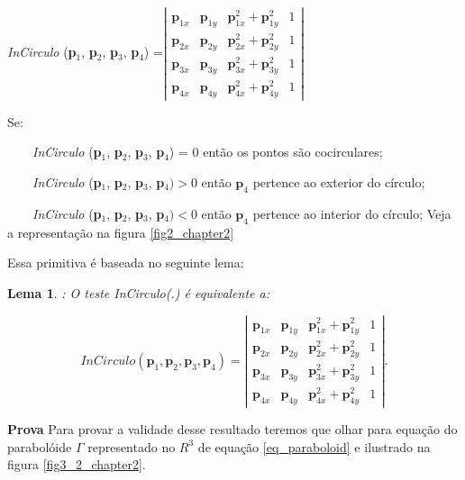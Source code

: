 \documentclass[12pt,a4paper]{book}
\newtheorem{Lem}{Lema}
\begin{document}
\textit{InCirculo }(\textbf{p}$_{1}$, \textbf{p}$_{2}$, \textbf{p}$_{3}$, 
\textbf{p}$_{4}$) =$\left| 
\begin{array}{cccc}
\mathbf{p}_{1x} & \mathbf{p}_{1y} & \mathbf{p}_{1x}^{2}+\mathbf{p}_{1y}^{2}
& 1 \\ 
\mathbf{p}_{2x} & \mathbf{p}_{2y} & \mathbf{p}_{2x}^{2}+\mathbf{p}_{2y}^{2}
& 1 \\ 
\mathbf{p}_{3x} & \mathbf{p}_{3y} & \mathbf{p}_{3x}^{2}+\mathbf{p}_{3y}^{2}
& 1 \\ 
\mathbf{p}_{4x} & \mathbf{p}_{4y} & \mathbf{p}_{4x}^{2}+\mathbf{p}_{4y}^{2}
& 1%
\end{array}
\right| $

Se:

\ \ \ \ \textit{InCirculo }(\textbf{p}$_{1}$, \textbf{p}$_{2}$, \textbf{p}$%
_{3}$, \textbf{p}$_{4}$) = 0 ent\~{a}o os pontos s\~{a}o cocirculares;

\ \ \ \ \textit{InCirculo }(\textbf{p}$_{1}$, \textbf{p}$_{2}$, \textbf{p}$%
_{3}$, \textbf{p}$_{4}) > 0$  ent\~{a}o $\mathbf{p}_{4}$
pertence ao exterior do c\'{i}rculo;

\ \ \ \ \textit{InCirculo }(\textbf{p}$_{1}$, \textbf{p}$_{2}$, \textbf{p}$%
_{3}$, \textbf{p}$_{4}) < 0$ ent\~{a}o $\mathbf{p}_{4}$
pertence ao interior do c\'{i}rculo;
Veja a representa\c{c}\~{a}o  na figura \ref{fig2_chapter2}
\ \ 

Essa primitiva \'{e} baseada no seguinte lema:

\begin{Lem}
: O teste \textit{InCirculo}(.) \'{e} equivalente a:
\end{Lem}

\begin{equation}
\textit{InCirculo} (\mathbf{p}_{1},\mathbf{p}_{2},\mathbf{p}_{3},\mathbf{p}_{4})=\left\vert 
\begin{array}{cccc}
\mathbf{p}_{1x} & \mathbf{p}_{1y} & \mathbf{p}_{1x}^{2}+\mathbf{p}_{1y}^{2}
& 1 \\ 
\mathbf{p}_{2x} & \mathbf{p}_{2y} & \mathbf{p}_{2x}^{2}+\mathbf{p}_{2y}^{2}
& 1 \\ 
\mathbf{p}_{3x} & \mathbf{p}_{3y} & \mathbf{p}_{3x}^{2}+\mathbf{p}_{3y}^{2}
& 1 \\ 
\mathbf{p}_{4x} & \mathbf{p}_{4y} & \mathbf{p}_{4x}^{2}+\mathbf{p}_{4y}^{2}
& 1%
\end{array}%
\right\vert .
\end{equation}

{\bf Prova} Para provar a validade desse resultado teremos que olhar para equa\c{c}\~{a}o
do parabol\'oide $\Gamma$ representado no $R^{3}$ de equa\c{c}\~{a}o \ref{eq_paraboloid} e ilustrado 
na figura \ref{fig3_2_chapter2}.
\end{document}
